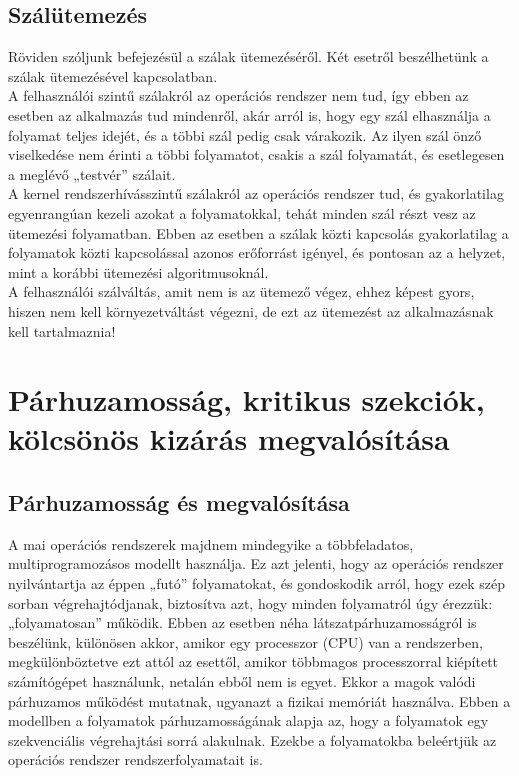\documentclass[tikz,12pt,margin=0px]{article}
\begin{document}
	\subsection*{Szálütemezés}

    \noindent Röviden szóljunk befejezésül a szálak ütemezéséről. Két esetről beszélhetünk a szálak ütemezésével kapcsolatban.\\

    \noindent A felhasználói szintű szálakról az operációs rendszer nem tud, így ebben az esetben az alkalmazás tud mindenről, akár arról is, hogy egy szál elhasználja a folyamat teljes idejét, és a többi szál pedig csak várakozik. Az ilyen szál önző viselkedése nem érinti a többi folyamatot, csakis a szál folyamatát, és esetlegesen a meglévő „testvér” szálait.\\

    \noindent A kernel rendszerhívásszintű szálakról az operációs rendszer tud, és gyakorlatilag egyenrangúan kezeli azokat a folyamatokkal, tehát minden szál részt vesz az ütemezési folyamatban. Ebben az esetben a szálak közti kapcsolás gyakorlatilag a folyamatok közti kapcsolással azonos erőforrást igényel, és pontosan az a helyzet, mint a korábbi ütemezési algoritmusoknál.\\

    \noindent A felhasználói szálváltás, amit nem is az ütemező végez, ehhez képest gyors, hiszen nem kell környezetváltást végezni, de ezt az ütemezést az alkalmazásnak kell tartalmaznia!

	\section*{Párhuzamosság, kritikus szekciók, kölcsönös kizárás megvalósítása}
	
	\subsection*{Párhuzamosság és megvalósítása}
	
    A mai operációs rendszerek majdnem mindegyike a többfeladatos, multiprogramozásos modellt használja. Ez azt jelenti, hogy az operációs rendszer nyilvántartja az éppen „futó” folyamatokat, és gondoskodik arról, hogy ezek szép sorban végrehajtódjanak, biztosítva azt, hogy minden folyamatról úgy érezzük: „folyamatosan” működik. Ebben az esetben néha látszatpárhuzamosságról is beszélünk, különösen akkor, amikor egy processzor (CPU) van a rendszerben, megkülönböztetve ezt attól az esettől, amikor többmagos processzorral kiépített számítógépet használunk, netalán ebből nem is egyet. Ekkor a magok valódi párhuzamos működést mutatnak, ugyanazt a fizikai memóriát használva. Ebben a modellben a folyamatok párhuzamosságának alapja az, hogy a folyamatok egy szekvenciális végrehajtási sorrá alakulnak. Ezekbe a folyamatokba beleértjük az operációs rendszer rendszerfolyamatait is.
\end{document}
